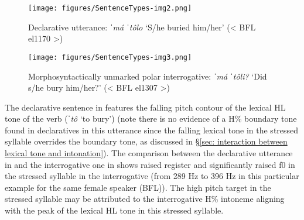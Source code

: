     \label{ex:14:intonation marked polar questionsa}
        \label{ex:14:intonation marked polar questionsb}
    \z
\z

\begin{figure}
\texttt{[image: figures/SentenceTypes-img2.png]}
\caption{
\label{fig: declarative intonation}
Declarative utterance: \textit{ˈmá ˈtôlo} `S/he buried him/her' (< BFL el1170 >)}
\end{figure}

\begin{figure}
\texttt{[image: figures/SentenceTypes-img3.png]}
\caption{
\label{fig: morphosyntactically unmarked polar intonation}
Morphosyntactically unmarked polar interrogative: \textit{ˈmá ˈtôli?} `Did s/he bury him/her?' (< BFL el1307 >)}
\end{figure}

The declarative sentence in  features the falling pitch contour of the lexical HL tone of the verb (\textit{ˈtô} `to bury') (note there is no evidence of a H\% boundary tone found in declaratives in this utterance since the falling lexical tone in the stressed syllable overrides the boundary tone, as discussed in §\ref{sec: interaction between lexical tone and intonation}). The comparison between the declarative utterance in  and the interrogative one in  shows raised register and significantly raised f0 in the stressed syllable in the interrogative (from 289 Hz to 396 Hz in this particular example for the same female speaker (BFL)). The high pitch target in the stressed syllable may be attributed to the interrogative H\% intoneme aligning with the peak of the lexical HL tone in this stressed syllable.

